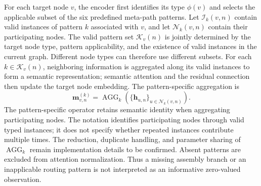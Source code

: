 For each target node $v$, the encoder first identifies its type $\phi(v)$ and selects the
applicable subset of the six predefined meta-path patterns. Let $\mathcal I_k(v,n)$ contain
valid instances of pattern $k$ associated with $v$, and let $\mathcal N_k(v,n)$ contain their
participating nodes. The valid pattern set $\mathcal K_v(n)$ is jointly determined by the target
node type, pattern applicability, and the existence of valid instances in the current graph.
Different node types can therefore use different subsets. For each $k\in\mathcal K_v(n)$,
neighboring information is aggregated along its valid instances to form a semantic representation;
semantic attention and the residual connection then update the target node embedding.
The pattern-specific aggregation is
\begin{equation}
 \boldsymbol{m}^{(k)}_{v,n}=\operatorname{AGG}_k
 \left(\{\boldsymbol{h}_{u,n}\}_{u\in\mathcal N_k(v,n)}\right).
 \label{eq:meta_path_embedding}
\end{equation}
The pattern-specific operator retains semantic identity when aggregating participating nodes.
The notation identifies participating nodes through valid typed instances; it does not specify
whether repeated instances contribute multiple times. The reduction, duplicate handling, and
parameter sharing of $\operatorname{AGG}_k$ remain implementation details to be confirmed.
Absent patterns are excluded from attention normalization. Thus a missing assembly branch or
an inapplicable routing pattern is not interpreted as an informative zero-valued observation.

